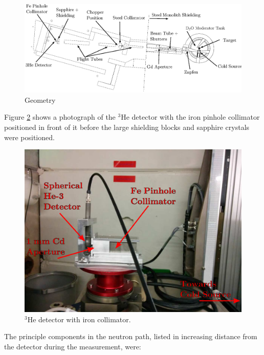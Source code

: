 \documentclass[preprint,12pt]{elsarticle}
\begin{document}
\begin{figure}[h!] 
  \centering
    \includegraphics[width=\columnwidth]{graphics/geom_bw_labels.eps}
     \caption{Geometry \label{fig:geom} }
\end{figure}

Figure \ref{fig:det} shows a photograph of the $^3$He detector with the iron pinhole collimator positioned in front of it before the large shielding blocks and sapphire crystals were positioned.

\begin{figure}[h!] 
  \centering
    \includegraphics[width=\columnwidth]{graphics/det.eps}
     \caption{$^3$He detector with iron collimator. \label{fig:det}}
\end{figure}

The principle components in the neutron path, listed in increasing distance from the detector during the measurement, were:
\end{document}
